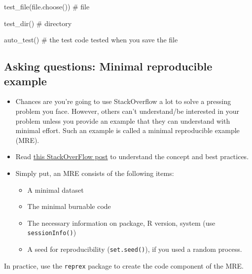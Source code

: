 \documentclass[
  letterpaper,
  DIV=11,
  numbers=noendperiod]{scrreprt}
\newenvironment{Shaded}{\begin{snugshade}}{\end{snugshade}}
\newcommand{\CommentTok}[1]{\textcolor[rgb]{0.37,0.37,0.37}{#1}}
\newcommand{\FunctionTok}[1]{\textcolor[rgb]{0.28,0.35,0.67}{#1}}
\newcommand{\NormalTok}[1]{\textcolor[rgb]{0.00,0.23,0.31}{#1}}
\providecommand{\tightlist}{%
  \setlength{\itemsep}{0pt}\setlength{\parskip}{0pt}}\usepackage{longtable,booktabs,array}
\begin{document}
\begin{Shaded}
\begin{Highlighting}[]
\FunctionTok{test\_file}\NormalTok{(}\FunctionTok{file.choose}\NormalTok{()) }\CommentTok{\# file }

\FunctionTok{test\_dir}\NormalTok{() }\CommentTok{\# directory}

\FunctionTok{auto\_test}\NormalTok{() }\CommentTok{\# the test code tested when you save the file }
\end{Highlighting}
\end{Shaded}

\hypertarget{asking-questions-minimal-reproducible-example}{%
\subsection*{Asking questions: Minimal reproducible
example}\label{asking-questions-minimal-reproducible-example}}

\begin{itemize}
\item
  Chances are you're going to use StackOverflow a lot to solve a
  pressing problem you face. However, others can't understand/be
  interested in your problem unless you provide an example that they can
  understand with minimal effort. Such an example is called a minimal
  reproducible example (MRE).
\item
  Read
  \href{https://stackoverflow.com/questions/5963269/how-to-make-a-great-r-reproducible-example}{this
  StackOverFlow post} to understand the concept and best practices.
\item
  Simply put, an MRE consists of the following items:

  \begin{itemize}
  \tightlist
  \item
    A minimal dataset
  \item
    The minimal burnable code
  \item
    The necessary information on package, R version, system (use
    \texttt{sessionInfo()})
  \item
    A seed for reproducibility (\texttt{set.seed()}), if you used a
    random process.
  \end{itemize}
\end{itemize}

In practice, use the \texttt{reprex} package to create the code
component of the MRE.
\end{document}
